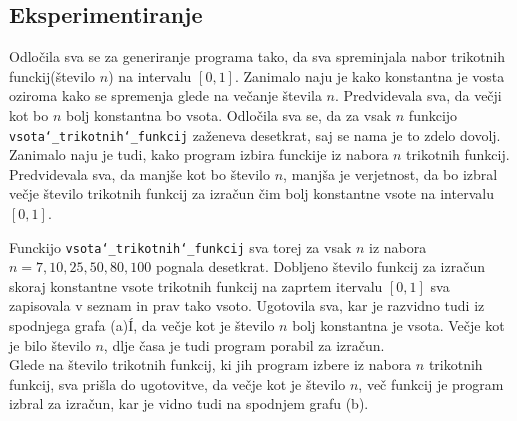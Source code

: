 \documentclass[11pt]{article}
\theoremstyle{definition}
\newcommand{\1}{\mathbbm{1}}
\begin{document}
\subsection{Eksperimentiranje}
\vspace{0.5cm}

Odločila sva se za generiranje programa tako, da sva spreminjala nabor trikotnih funckij(število $n$) na intervalu $[0,1]$. Zanimalo naju je kako konstantna je vosta oziroma kako se spremenja glede na večanje števila $n$. Predvidevala sva, da večji kot bo $n$ bolj konstantna bo vsota. Odločila sva se, da za vsak $n$ funkcijo \texttt{vsota\char`_trikotnih\char`_funkcij} zaženeva desetkrat, saj se nama je to zdelo dovolj. 
Zanimalo naju je tudi, kako program izbira funckije iz nabora $n$ trikotnih funkcij. Predvidevala sva, da manjše kot bo število $n$, manjša je verjetnost, da bo izbral večje število trikotnih funkcij za izračun čim bolj konstantne vsote na intervalu $[0,1]$. \\
\vspace{0.25cm}

Funckijo \texttt{vsota\char`_trikotnih\char`_funkcij} sva torej za vsak $n$ iz nabora $n = {7, 10, 25, 50, 80, 100}$ pognala desetkrat. Dobljeno število funkcij za izračun skoraj konstantne vsote trikotnih funkcij na zaprtem itervalu $[0,1]$ sva zapisovala v seznam in prav tako vsoto. 
Ugotovila sva, kar je razvidno tudi iz spodnjega grafa (a)Í, da večje kot je število $n$ bolj konstantna je vsota. Večje kot je bilo število $n$, dlje časa je tudi program porabil za izračun. \\

Glede na število trikotnih funkcij, ki jih program izbere iz nabora $n$ trikotnih funkcij, sva prišla do ugotovitve, da večje kot je število $n$, več funkcij je program izbral za izračun, kar je vidno tudi na spodnjem grafu (b). \\	
\end{document}
